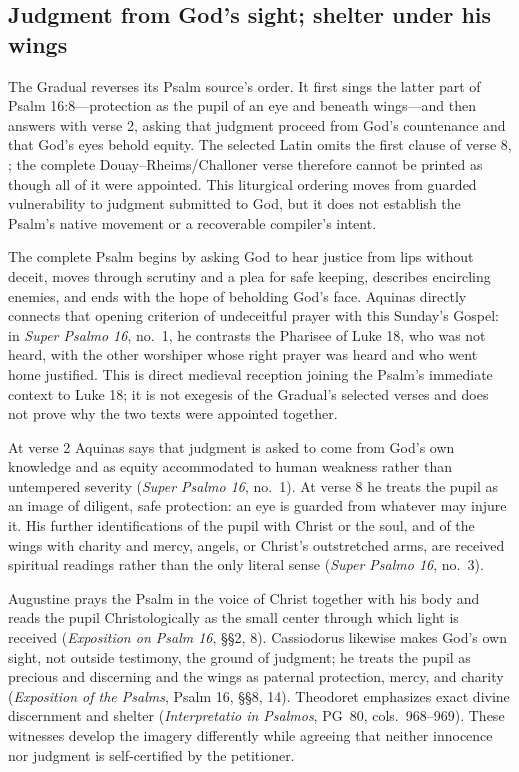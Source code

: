 \sectionguard
\subsection*{Judgment from God's sight; shelter under his wings\enspace{}}

The Gradual reverses its Psalm source's order. It first sings the latter part
of Psalm 16:8---protection as the pupil of an eye and beneath wings---and then
answers with verse 2, asking that judgment proceed from God's countenance and
that God's eyes behold equity. The selected Latin omits the first clause of
verse 8, ; the complete
Douay--Rheims/Challoner verse therefore cannot be printed as though all of it
were appointed. This liturgical ordering moves from guarded vulnerability to
judgment submitted to God, but it does not establish the Psalm's native
movement or a recoverable compiler's intent.

The complete Psalm begins by asking God to hear justice from lips without
deceit, moves through scrutiny and a plea for safe keeping, describes
encircling enemies, and ends with the hope of beholding God's face. Aquinas
directly connects that opening criterion of undeceitful prayer with this
Sunday's Gospel: in \emph{Super Psalmo 16}, no.~1, he contrasts the Pharisee
of Luke 18, who was not heard, with the other worshiper whose right prayer was
heard and who went home justified. This is direct medieval reception joining
the Psalm's immediate context to Luke 18; it is not exegesis of the Gradual's
selected verses and does not prove why the two texts were appointed together.

At verse 2 Aquinas says that judgment is asked to come from God's own
knowledge and as equity accommodated to human weakness rather than untempered
severity (\emph{Super Psalmo 16}, no.~1). At verse 8 he treats the pupil as an
image of diligent, safe protection: an eye is guarded from whatever may injure
it. His further identifications of the pupil with Christ or the soul, and of
the wings with charity and mercy, angels, or Christ's outstretched arms, are
received spiritual readings rather than the only literal sense
(\emph{Super Psalmo 16}, no.~3).

Augustine prays the Psalm in the voice of Christ together with his body and
reads the pupil Christologically as the small center through which light is
received (\emph{Exposition on Psalm 16}, §§2, 8). Cassiodorus likewise makes
God's own sight, not outside testimony, the ground of judgment; he treats the
pupil as precious and discerning and the wings as paternal protection, mercy,
and charity (\emph{Exposition of the Psalms}, Psalm 16, §§8, 14).
Theodoret emphasizes exact divine discernment and shelter
(\emph{Interpretatio in Psalmos}, PG~80, cols.~968--969). These witnesses
develop the imagery differently while agreeing that neither innocence nor
judgment is self-certified by the petitioner.

